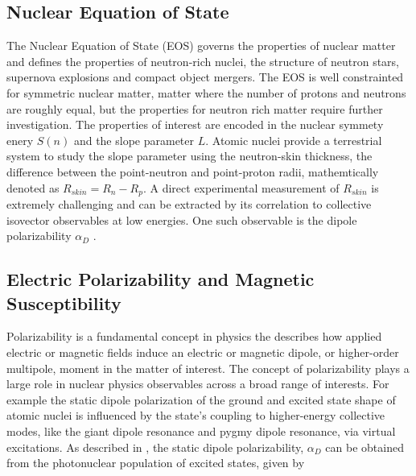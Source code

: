 \documentclass[cnatzke_thesis_proposal.tex]{subfiles}
\begin{document}
    \subsection{Nuclear Equation of State}
The Nuclear Equation of State (EOS) governs the properties of nuclear matter and defines the properties of neutron-rich nuclei, the structure of neutron stars, supernova explosions and compact object mergers. \cite{Kaufmann2020} The EOS is well constrainted for symmetric nuclear matter, matter where the number of protons and neutrons are roughly equal, but the properties for neutron rich matter require further investigation. \cite{Danielewicz2002} 
The properties of interest are encoded in the nuclear symmety enery $S(n)$ and the slope parameter $L$. Atomic nuclei provide a terrestrial system to study the slope parameter using the neutron-skin thickness, the difference between the point-neutron and point-proton radii, mathemtically denoted as $R_{skin} = R_n - R_p$. \cite{Tsang2012} A direct experimental measurement of $R_{skin}$ is extremely challenging and can be extracted by its correlation to collective isovector observables at low energies. \cite{Birkhan2017} One such observable is the dipole polarizability $\alpha_D$ \cite{Birkhan2017}.

\subsection{Electric Polarizability and Magnetic Susceptibility}
Polarizability is a fundamental concept in physics the describes how applied electric or magnetic fields induce an electric or magnetic dipole, or higher-order multipole, moment in the matter of interest.\cite{jackson_classical_1999} The concept of polarizability plays a large role in nuclear physics observables across a broad range of interests. For example the static dipole polarization of the ground and excited state shape of atomic nuclei is influenced by the state's coupling to higher-energy collective modes, like the giant dipole resonance and pygmy dipole resonance, via virtual excitations. As described in \cite{soderstrom_electromagnetic_2020}, the static dipole polarizability, $\alpha_D$ can be obtained from the photonuclear population of excited states, given by
\end{document}
